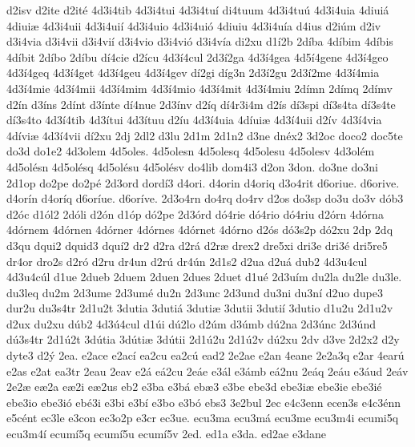 {d2isv
d2ite
d2it^^e9
4d3i4tib
4d3i4tui
4d3i4tu^^ed
di4tuum
4d3i4tu^^fa
4d3i4uia
4diui^^e1
4diui^^e6
4d3i4uii
4d3i4ui^^ed
4d3i4uio
4d3i4ui^^f3
4diuiu
4d3i4u^^eda
d4ius
d2i^^fam
d2iv
d3i4via
d3i4vii
d3i4vi^^ed
d3i4vio
d3i4vi^^f3
d3i4v^^eda
di2xu
d1^^ed2b
2d^^edba
4d^^edbim
4d^^edbis
4d^^edbit
2d^^edbo
2d^^edbu
d^^ed4cie
d2^^edcu
4d3^^ed4cul
2d3^^ed2ga
4d3^^ed4gea
4d5^^ed4gene
4d3^^ed4geo
4d3^^ed4geq
4d3^^ed4get
4d3^^ed4geu
4d3^^ed4gev
d^^ed2gi
d^^edg3n
2d3^^ed2gu
2d3^^ed2me
4d3^^ed4mia
4d3^^ed4mie
4d3^^ed4mii
4d3^^ed4mim
4d3^^ed4mio
4d3^^ed4mit
4d3^^ed4miu
2d^^edmn
2d^^edmq
2d^^edmv
d2^^edn
d3^^edns
2d^^ednt
d3^^ednte
d^^ed4nue
2d3^^ednv
d2^^edq
d^^ed4r3i4m
d2^^eds
d^^ed3spi
d^^ed3s4ta
d^^ed3s4te
d^^ed3s4to
4d3^^ed4tib
4d3^^edtui
4d3^^edtuu
d2^^edu
4d3^^ed4uia
4d^^edui^^e6
4d3^^ed4uii
d2^^edv
4d3^^ed4via
4d^^edvi^^e6
4d3^^ed4vii
d^^ed2xu
2dj
2dl2
d3lu
2d1m
2d1n2
d3ne
dn^^e9x2
3d2oc
doco2
doc5te
do3d
do1e2
4d3olem
4d5oles.
4d5olesn
4d5olesq
4d5olesu
4d5olesv
4d3ol^^e9m
4d5ol^^e9sn
4d5ol^^e9sq
4d5ol^^e9su
4d5ol^^e9sv
do4lib
dom4i3
d2on
3don.
do3ne
do3ni
2d1op
do2pe
do2p^^e9
2d3ord
dord^^ed3
d4ori.
d4orin
d4oriq
d3o4rit
d6oriue.
d6orive.
d4or^^edn
d4or^^edq
d6or^^edue.
d6or^^edve.
2d3o4rn
do4rq
do4rv
d2os
do3sp
do3u
do3v
d^^f3b3
d2^^f3c
d1^^f3l2
2d^^f3li
d2^^f3n
d1^^f3p
d^^f32pe
2d3^^f3rd
d^^f34rie
d^^f34rio
d^^f34riu
d2^^f3rn
4d^^f3rna
4d^^f3rnem
4d^^f3rnen
4d^^f3rner
4d^^f3rnes
4d^^f3rnet
4d^^f3rno
d2^^f3s
d^^f33s2p
d^^f32xu
2dp
2dq
d3qu
dqui2
dquid3
dqu^^ed2
dr2
d2ra
d2r^^e1
d2r^^e6
drex2
dre5xi
dri3e
dri3^^e9
dri5re5
dr4or
dro2s
d2r^^f3
d2ru
dr4un
d2r^^fa
dr4^^fan
2d1s2
d2ua
d2u^^e1
dub2
4d3u4cul
4d3u4c^^fal
d1ue
2dueb
2duem
2duen
2dues
2duet
d1u^^e9
2d3u^^edm
du2la
du2le
du3le.
du3leq
du2m
2d3ume
2d3um^^e9
du2n
2d3unc
2d3und
du3ni
du3n^^ed
d2uo
dupe3
dur2u
du3s4tr
2d1u2t
3dutia
3duti^^e1
3duti^^e6
3dutii
3duti^^ed
3dutio
d1u2u
2d1u2v
d2ux
du2xu
d^^fab2
4d3^^fa4cul
d1^^fai
d^^fa2lo
d2^^fam
d3^^famb
d^^fa2na
2d3^^fanc
2d3^^fand
d^^fa3s4tr
2d1^^fa2t
3d^^fatia
3d^^fati^^e6
3d^^fatii
2d1^^fa2u
2d1^^fa2v
d^^fa2xu
2dv
d3ve
2d2x2
d2y
dyte3
d2^^fd
2ea.
e2ace
e2ac^^ed
ea2cu
ea2c^^fa
ead2
2e2ae
e2an
4eane
2e2a3q
e2ar
4ear^^fa
e2as
e2at
ea3tr
2eau
2eav
e2^^e1
e^^e12cu
2e^^e1e
e3^^e1l
e3^^e1mb
e^^e12nu
2e^^e1q
2e^^e1u
e3^^e1ud
2e^^e1v
2e2^^e6
e^^e62a
e^^e62i
e^^e62us
eb2
e3ba
e3b^^e1
eb^^e63
e3be
ebe3d
ebe3i^^e6
ebe3ie
ebe3i^^e9
ebe3io
ebe3i^^f3
eb^^e93i
e3bi
e3b^^ed
e3bo
e3b^^f3
ebs3
3e2bul
2ec
e4c3enn
ecen3s
e4c3^^e9nn
e5c^^e9nt
ec3le
e3con
ec3o2p
e3cr
ec3ue.
ecu3ma
ecu3m^^e1
ecu3me
ecu3m4i
ecumi5q
ecu3m4^^ed
ecum^^ed5q
ecum^^ed5u
ecum^^ed5v
2ed.
ed1a
e3da.
ed2ae
e3dane
}
